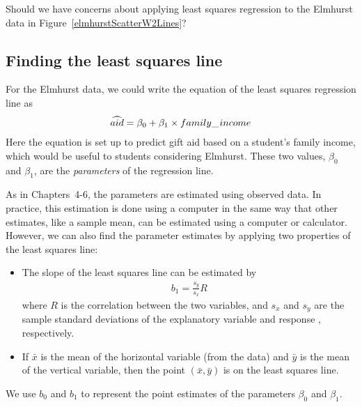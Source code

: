 \begin{exercisewrap}
\begin{nexercise}
Should we have concerns about applying least squares regression to the Elmhurst data in Figure~\ref{elmhurstScatterW2Lines}?\footnotemark
\end{nexercise}
\end{exercisewrap}


\subsection{Finding the least squares line}
\label{findingTheLeastSquaresLineSection}

For the Elmhurst data, we could write the equation of the least squares regression line as
\begin{eqnarray*}
\widehat{aid} = \beta_0 + \beta_{1}\times family\_\hspace{0.3mm}income
\end{eqnarray*}
Here the equation is set up to predict gift aid based on a student's family income, which would be useful to students considering Elmhurst. These two values, $\beta_0$ and $\beta_1$, are the \emph{parameters} of the regression line.

As in Chapters~4-6, the parameters are estimated using observed data. In practice, this estimation is done using a computer in the same way that other estimates, like a sample mean, can be estimated using a computer or calculator. However, we can also find the parameter estimates by applying two properties of the least squares line:
\begin{itemize}
\item The slope of the least squares line can be estimated by
\begin{align*}
b_1 = \frac{s_y}{s_x} R
\end{align*}
where $R$ is the correlation between the two variables, and $s_x$ and $s_y$ are the sample standard deviations of the explanatory variable %
and response%
, respectively.
\item If $\bar{x}$ is the mean of the horizontal variable (from the data) and $\bar{y}$ is the mean of the vertical variable, then the point $(\bar{x}, \bar{y})$ is on the least squares line.
\end{itemize}
We use $b_0$ and $b_1$ to represent the point estimates of the parameters $\beta_0$ and $\beta_1$.


